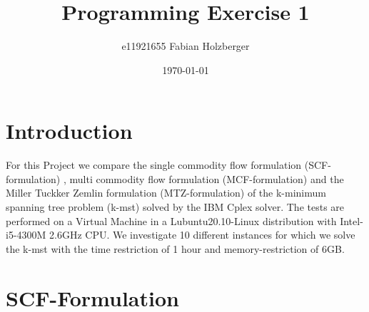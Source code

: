 \documentclass[11pt]{article}
\title{Programming Exercise 1}
\author{e11921655 Fabian Holzberger}
\date{\today}
\begin{document}
\graphicspath{{./figures/}}
\maketitle

%
\section{Introduction}
For this Project we compare the single commodity flow formulation (SCF-formulation) , multi commodity flow formulation (MCF-formulation) and the Miller Tuckker Zemlin formulation (MTZ-formulation) of the k-minimum spanning tree problem (k-mst) solved by the IBM Cplex solver. The tests are performed on a Virtual Machine in a Lubuntu20.10-Linux distribution with Intel-i5-4300M 2.6GHz CPU. We investigate 10 different instances for which we solve the k-mst with the time restriction of 1 hour and memory-restriction of 6GB.
\section{SCF-Formulation}
\end{document}
